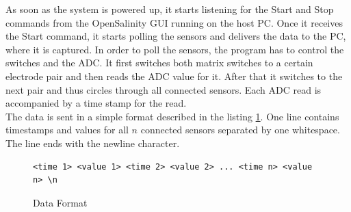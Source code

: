 As soon as the system is powered up, it starts listening for the Start and Stop commands from the OpenSalinity GUI running on the host PC. Once it receives the Start command, it starts polling the sensors and delivers the data to the PC, where it is captured.
In order to poll the sensors, the program has to control the switches and the ADC. It first switches both matrix switches to a certain electrode pair and then reads the ADC value for it. After that it switches to the next pair and thus circles through all connected sensors. Each ADC read is accompanied by a time stamp for the read.\\

The data is sent in a simple format described in the listing \ref{format}. One line contains timestamps and values for all $n$ connected sensors separated by one whitespace. The line ends with the newline character.

\begin{figure}[H]
\begin{center}
\begin{lstlisting}
<time 1> <value 1> <time 2> <value 2> ... <time n> <value n> \n
\end{lstlisting}
\caption{Data Format}
\label{format}
\end{center}
\end{figure}

